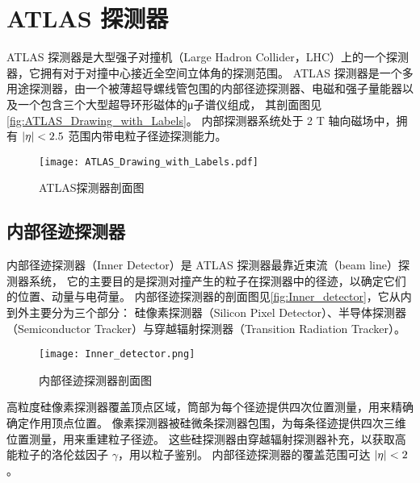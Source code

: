 
\chapter{ATLAS 探测器}
ATLAS 探测器是大型强子对撞机（Large Hadron Collider，LHC）上的一个探测器，它拥有对于对撞中心接近全空间立体角的探测范围。
ATLAS 探测器是一个多用途探测器，由一个被薄超导螺线管包围的内部径迹探测器、电磁和强子量能器以及一个包含三个大型超导环形磁体的μ子谱仪组成，
其剖面图见\autoref{fig:ATLAS_Drawing_with_Labels}。
内部探测器系统处于 2 T 轴向磁场中，拥有 $\abs{\eta} < 2.5$ 范围内带电粒子径迹探测能力。
\cite{ATLAS_detector}

\begin{figure}[ht]
    \centering
    \texttt{[image: ATLAS\_Drawing\_with\_Labels.pdf]}
    \caption{ATLAS探测器剖面图}
    \label{fig:ATLAS_Drawing_with_Labels}
\end{figure}


\section{内部径迹探测器}
内部径迹探测器（Inner Detector）是 ATLAS 探测器最靠近束流（beam line）探测器系统，
它的主要目的是探测对撞产生的粒子在探测器中的径迹，以确定它们的位置、动量与电荷量。
内部径迹探测器的剖面图见\autoref{fig:Inner_detector}，它从内到外主要分为三个部分：
硅像素探测器（Silicon Pixel Detector）、半导体探测器（Semiconductor Tracker）与穿越辐射探测器（Transition Radiation Tracker）。

\begin{figure}[ht]
    \centering
    \texttt{[image: Inner\_detector.png]}
    \caption{内部径迹探测器剖面图}
    \label{fig:Inner_detector}
\end{figure}

高粒度硅像素探测器覆盖顶点区域，筒部为每个径迹提供四次位置测量，用来精确确定作用顶点位置。
像素探测器被硅微条探测器包围，为每条径迹提供四次三维位置测量，用来重建粒子径迹。
这些硅探测器由穿越辐射探测器补充，以获取高能粒子的洛伦兹因子 $\gamma$，用以粒子鉴别。
内部径迹探测器的覆盖范围可达 $\abs{\eta} < 2$。


